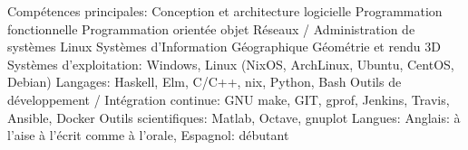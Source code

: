 \begin{cvskills}
  \cvskill
    {Compétences principales:}
 	{
        Conception et architecture logicielle\newline
        Programmation fonctionnelle \newline
		Programmation orientée objet \newline
        Réseaux / Administration de systèmes Linux \newline
 	 	Systèmes d'Information Géographique \newline
	 	Géométrie et rendu 3D
	}
  \cvskill
    {Systèmes d'exploitation:}
 	{Windows, Linux (NixOS, ArchLinux, Ubuntu, CentOS, Debian)}
  \cvskill
    {Langages:}
 	{Haskell, Elm, C/C++, nix, Python, Bash}
  \cvskill
	{Outils de développement / Intégration continue:}
	{GNU make, GIT, gprof, Jenkins, Travis, Ansible, Docker}
  \cvskill
	{Outils scientifiques:}
	{Matlab, Octave, gnuplot}
  \cvskill
    {Langues:}
 	{
        Anglais: à l'aise à l'écrit comme à l'orale,
        Espagnol: débutant
    }
\end{cvskills}


